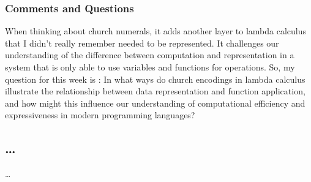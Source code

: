 \documentclass{article}
\theoremstyle{theorem}
\theoremstyle{definition}
\theoremstyle{remark}
\begin{document}
\subsubsection*{Comments and Questions}
When thinking about church numerals, it adds another layer to lambda calculus that
I didn't really remember needed to be represented. It challenges our understanding of 
the difference between computation and representation in a system that is only able to 
use variables and functions for operations. So, my question for this week is :
In what ways do church encodings in lambda calculus illustrate the relationship between 
data representation and function application, and how might this influence our understanding
of computational efficiency and expressiveness in modern programming languages?
\subsection{\ldots}

\ldots








\end{document}
